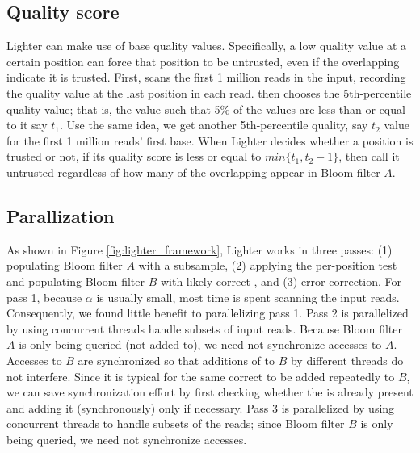 \documentclass[10pt]{article}
\begin{document}

\subsection*{Quality score}
Lighter can make use of base quality values.  Specifically, a low quality value at a certain position can force that position to be untrusted, even if the overlapping \kmers indicate it is trusted.  First, \tool scans the first 1 million reads in the input, recording the quality value at the last position in each read.  \tool then chooses the 5th-percentile quality value; that is, the value such that 5\% of the values are less than or equal to it say $t_1$. Use the same idea, we get another 5th-percentile quality, say $t_2$ value for the first 1 million reads' first base. When Lighter decides whether a position is trusted or not, if its quality score is less or equal to $min\{t_1, t_2 - 1\}$, then call it untrusted regardless of how many of the overlapping \kmers appear in Bloom filter $A$. 

\subsection*{Parallization} 
As shown in Figure \ref{fig:lighter_framework}, Lighter works in three passes: (1) populating Bloom filter $A$ with a \kmer subsample, (2) applying the per-position test and populating Bloom filter $B$ with likely-correct \kmers, and (3) error correction.  For pass 1, because $\alpha$ is usually small, most time is spent scanning the input reads.  Consequently, we found little benefit to parallelizing pass 1.  Pass 2 is parallelized by using concurrent threads handle subsets of input reads.  Because Bloom filter $A$ is only being queried (not added to), we need not synchronize accesses to $A$.  Accesses to $B$ are synchronized so that additions of \kmers to $B$ by different threads do not interfere.  Since it is typical for the same correct \kmer to be added repeatedly to $B$, we can save synchronization effort by first checking whether the \kmer is already present and adding it (synchronously) only if necessary.  Pass 3 is parallelized by using concurrent threads to handle subsets of the reads; since Bloom filter $B$ is only being queried, we need not synchronize accesses.
\end{document}
